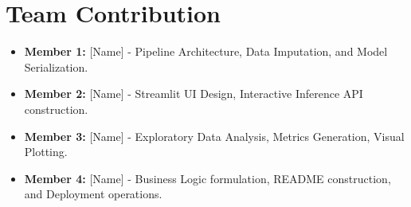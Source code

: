 \documentclass[a4paper,12pt]{article}
\begin{document}
\section{Team Contribution}
\begin{itemize}
    \item \textbf{Member 1:} [Name] - Pipeline Architecture, Data Imputation, and Model Serialization.
    \item \textbf{Member 2:} [Name] - Streamlit UI Design, Interactive Inference API construction.
    \item \textbf{Member 3:} [Name] - Exploratory Data Analysis, Metrics Generation, Visual Plotting.
    \item \textbf{Member 4:} [Name] - Business Logic formulation, README construction, and Deployment operations.
\end{itemize}
\end{document}
